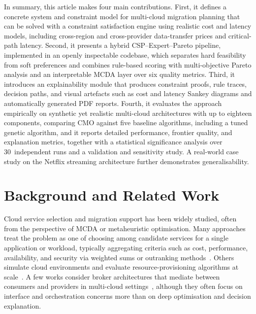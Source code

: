 \documentclass[journal]{IEEEtran}
\newcommand{\cmo}{CMO\xspace}
\begin{document}
In summary, this article makes four main contributions. First, it defines a
concrete system and constraint model for multi-cloud migration planning that
can be solved with a constraint satisfaction engine using realistic cost and
latency models, including cross-region and cross-provider data-transfer prices
and critical-path latency. Second, it presents a hybrid CSP--Expert--Pareto
pipeline, implemented in an openly inspectable codebase, which separates hard
feasibility from soft preferences and combines rule-based scoring with
multi-objective Pareto analysis and an interpretable MCDA layer over six quality
metrics. Third, it introduces an explainability module that produces constraint
proofs, rule traces, decision paths, and visual artefacts such as cost and
latency Sankey diagrams and automatically generated PDF reports. Fourth, it
evaluates the approach empirically on synthetic yet realistic multi-cloud
architectures with up to eighteen components, comparing \cmo against five
baseline algorithms, including a tuned genetic algorithm, and it reports
detailed performance, frontier quality, and explanation metrics, together with a
statistical significance analysis over 30~independent runs and a validation and
sensitivity study. A real-world case study on the Netflix streaming architecture
further demonstrates generalisability.

\section{Background and Related Work}
\label{sec:related}

Cloud service selection and migration support has been widely studied, often
from the perspective of MCDA or metaheuristic optimisation. Many approaches
treat the problem as one of choosing among candidate services for a single
application or workload, typically aggregating criteria such as cost,
performance, availability, and security via weighted sums or outranking
methods~\cite{garg_framework,zhan_selection,han_multicriteria}. Others simulate
cloud environments and evaluate resource-provisioning algorithms at
scale~\cite{calheiros_cloudsim,buyya_intercloud}. A few works consider broker
architectures that mediate between consumers and providers in multi-cloud
settings~\cite{celesti_enhance,petcu_multicloud,menzel_cloudgenius}, although
they often focus on interface and orchestration concerns more than on deep
optimisation and decision explanation.
\end{document}
